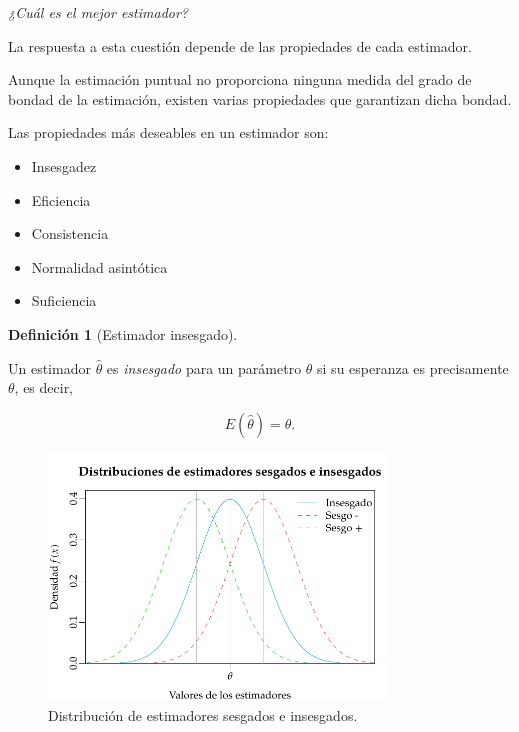 \documentclass[
  a4paper,
]{scrreport}
\providecommand{\tightlist}{%
  \setlength{\itemsep}{0pt}\setlength{\parskip}{0pt}}\usepackage{longtable,booktabs,array}
\theoremstyle{plain}
\theoremstyle{definition}
\theoremstyle{definition}
\newtheorem{definition}{Definición}[chapter]
\theoremstyle{remark}
\begin{document}
\emph{¿Cuál es el mejor estimador?}

La respuesta a esta cuestión depende de las propiedades de cada
estimador.

Aunque la estimación puntual no proporciona ninguna medida del grado de
bondad de la estimación, existen varias propiedades que garantizan dicha
bondad.

Las propiedades más deseables en un estimador son:

\begin{itemize}
\tightlist
\item
  Insesgadez
\item
  Eficiencia
\item
  Consistencia
\item
  Normalidad asintótica
\item
  Suficiencia
\end{itemize}

\begin{definition}[Estimador
insesgado]\protect\hypertarget{def-estimador-insesgado}{}\label{def-estimador-insesgado}

Un estimador \(\hat \theta\) es \emph{insesgado} para un parámetro
\(\theta\) si su esperanza es precisamente \(\theta\), es decir,

\[
E(\hat \theta)=\theta.
\]

\end{definition}

\begin{figure}

{\centering \includegraphics[width=0.8\textwidth,height=\textheight]{img/estimacion/estimadores-sesgados-insesgados.pdf}

}

\caption{Distribución de estimadores sesgados e insesgados.}

\end{figure}
\end{document}

